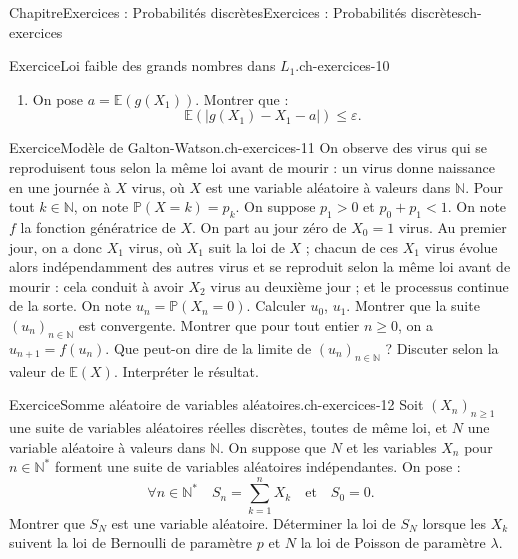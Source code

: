 \documentclass[twoside,10pt,]{book}
\numberwithin{equation}{chapter}
\newcommand{\N}{\mathbb N}
\renewcommand{\Pr}{\mathbb P}
\newcommand{\Es}{\mathbb E}
\newcommand{\lt}{<}
\newcommand{\gt}{>}
\begin{document}
\begin{chapterptx}{Chapitre}{Exercices : Probabilités discrètes}{}{Exercices : Probabilités discrètes}{}{}{ch-exercices}
\begin{inlineexercise}{Exercice}{Loi faible des grands nombres dans \(L_{1}\).}{ch-exercices-10}
\begin{enumerate}[label={\arabic*.}]
\begin{equation*}
\end{equation*}
Montrer que la variable aléatoire \(g(X_{1})\) est d'espérance finie et que l'on peut choisir \(c\) tel que \(\Es(|g(X_{1}) - X_{1}|) \leqslant \frac{\varepsilon}{2}\).%
\item{}On pose \(a = \Es(g(X_{1}))\). Montrer que :%
\begin{equation*}
\Es(|g(X_{1}) - X_{1} - a|) \leqslant \varepsilon.
\end{equation*}
%
\end{enumerate}
\end{inlineexercise}%
\begin{inlineexercise}{Exercice}{Modèle de Galton-Watson.}{ch-exercices-11}%
On observe des virus qui se reproduisent tous selon la même loi avant de mourir : un virus donne naissance en une journée à \(X\) virus, où \(X\) est une variable aléatoire à valeurs dans \(\N\). Pour tout \(k \in \N\), on note \(\Pr(X = k) = p_{k}\). On suppose \(p_{1}\gt0\) et \(p_{0} + p_{1} \lt 1\). On note \(f\) la fonction génératrice de \(X\). On part au jour zéro de \(X_{0} = 1\) virus. Au premier jour, on a donc \(X_{1}\) virus, où \(X_{1}\) suit la loi de \(X\) ; chacun de ces \(X_{1}\) virus évolue alors indépendamment des autres virus et se reproduit selon la même loi avant de mourir : cela conduit à avoir \(X_{2}\) virus au deuxième jour ; et le processus continue de la sorte. On note \(u_{n} = \Pr(X_{n} = 0)\).%
Calculer \(u_{0}\), \(u_{1}\).%
Montrer que la suite \((u_{n})_{n \in \N}\) est convergente.%
Montrer que pour tout entier \(n \geqslant 0\), on a \(u_{n+1} = f(u_{n})\).%
Que peut-on dire de la limite de \((u_{n})_{n \in \N}\) ? Discuter selon la valeur de \(\Es(X)\). Interpréter le résultat.%
\end{inlineexercise}%
\begin{inlineexercise}{Exercice}{Somme aléatoire de variables aléatoires.}{ch-exercices-12}%
Soit \((X_{n})_{n \geqslant 1}\) une suite de variables aléatoires réelles discrètes, toutes de même loi, et \(N\) une variable aléatoire à valeurs dans \(\N\). On suppose que \(N\) et les variables \(X_{n}\) pour \(n \in \N^{*}\) forment une suite de variables aléatoires indépendantes. On pose :%
\begin{equation*}
\forall n \in \N^{*} \quad S_{n} = \sum_{k=1}^{n} X_{k} \quad \text{et} \quad S_{0} = 0.
\end{equation*}
%
Montrer que \(S_{N}\) est une variable aléatoire.%
Déterminer la loi de \(S_{N}\) lorsque les \(X_{k}\) suivent la loi de Bernoulli de paramètre \(p\) et \(N\) la loi de Poisson de paramètre \(\lambda\).%

\end{inlineexercise}
\end{chapterptx}
\end{document}
